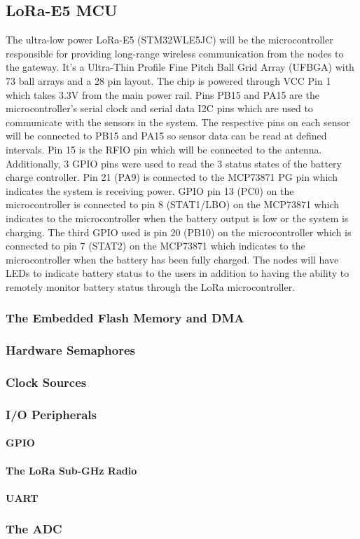 \subsection{LoRa-E5 MCU}
The ultra-low power LoRa-E5 (STM32WLE5JC) will be the microcontroller responsible for providing long-range wireless communication from the nodes to the gateway. It's a Ultra-Thin Profile Fine Pitch Ball Grid Array (UFBGA) with 73 ball arrays and a 28 pin layout. The chip is powered through VCC Pin 1 which takes 3.3V from the main power rail. Pins PB15 and PA15 are the microcontroller's serial clock and serial data I2C pins which are used to communicate with the sensors in the system. The respective pins on each sensor will be connected to PB15 and PA15 so sensor data can be read at defined intervals. Pin 15 is the RFIO pin which will be connected to the antenna. Additionally, 3 GPIO pins were used to read the 3 status states of the battery charge controller. Pin 21 (PA9) is connected to the MCP73871 PG pin which indicates the system is receiving power. GPIO pin 13 (PC0) on the microcontroller is connected to pin 8 (STAT1/LBO) on the MCP73871 which indicates to the microcontroller when the battery output is low or the system is charging. The third GPIO used is pin 20 (PB10) on the microcontroller which is connected to pin 7 (STAT2) on the MCP73871 which indicates to the microcontroller when the battery has been fully  charged. The nodes will have LEDs to indicate battery status to the users in addition to having the ability to remotely monitor battery status through the LoRa microcontroller. 

\subsubsection{The Embedded Flash Memory and DMA}

\subsubsection{Hardware Semaphores}

\subsubsection{Clock Sources}

\subsubsection{I/O Peripherals}
\paragraph{GPIO}
\paragraph{The LoRa Sub-GHz Radio}
\paragraph{\iic}
\paragraph{UART}

\subsubsection{The ADC}
